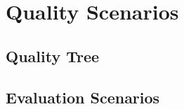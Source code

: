 
\chapter{Quality Scenarios}
\label{chap:Quality Scenarios}


\section{Quality Tree}
\label{sec:Quality Tree}


\section{Evaluation Scenarios}
\label{sec:Evaluation Scenarios}
